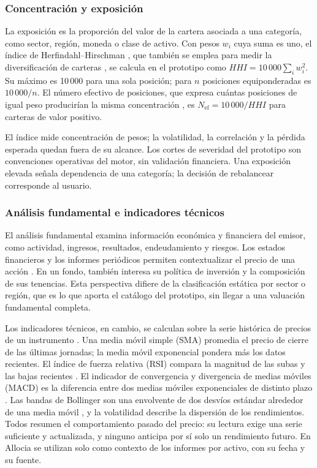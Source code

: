 \subsubsection{Concentración y exposición}\label{subsec:hhi}

La exposición es la proporción del valor de la cartera asociada a una categoría, como sector, región, moneda o clase de activo. Con pesos $w_i$ cuya suma es uno, el índice de Herfindahl--Hirschman \parencite{Rhoades1993}, que también se emplea para medir la diversificación de carteras \parencite{WoerheidePersson1992}, se calcula en el prototipo como $HHI=10\,000\sum_i w_i^2$. Su máximo es 10\,000 para una sola posición; para $n$ posiciones equiponderadas es $10\,000/n$. El número efectivo de posiciones, que expresa cuántas posiciones de igual peso producirían la misma concentración \parencite{LaaksoTaagepera1979}, es $N_{\mathrm{ef}}=10\,000/HHI$ para carteras de valor positivo.

El índice mide concentración de pesos; la volatilidad, la correlación y la pérdida esperada quedan fuera de su alcance. Los cortes de severidad del prototipo son convenciones operativas del motor, sin validación financiera. Una exposición elevada señala dependencia de una categoría; la decisión de rebalancear corresponde al usuario.

\subsubsection{Análisis fundamental e indicadores técnicos}\label{subsec:analisis-fundamental}\label{subsubsec:indicadores-tecnicos}

El análisis fundamental examina información económica y financiera del emisor, como actividad, ingresos, resultados, endeudamiento y riesgos. Los estados financieros y los informes periódicos permiten contextualizar el precio de una acción \parencite{SEC10K}. En un fondo, también interesa su política de inversión y la composición de sus tenencias. Esta perspectiva difiere de la clasificación estática por sector o región, que es lo que aporta el catálogo del prototipo, sin llegar a una valuación fundamental completa.

Los indicadores técnicos, en cambio, se calculan sobre la serie histórica de precios de un instrumento \parencite{Murphy1999}. Una media móvil simple (SMA) promedia el precio de cierre de las últimas jornadas; la media móvil exponencial pondera más los datos recientes. El índice de fuerza relativa (RSI) compara la magnitud de las subas y las bajas recientes \parencite{Wilder1978}. El indicador de convergencia y divergencia de medias móviles (MACD) es la diferencia entre dos medias móviles exponenciales de distinto plazo \parencite{Appel2005}. Las bandas de Bollinger son una envolvente de dos desvíos estándar alrededor de una media móvil \parencite{Bollinger2001}, y la volatilidad describe la dispersión de los rendimientos. Todos resumen el comportamiento pasado del precio: su lectura exige una serie suficiente y actualizada, y ninguno anticipa por sí solo un rendimiento futuro. En Allocia se utilizan solo como contexto de los informes por activo, con su fecha y su fuente.


